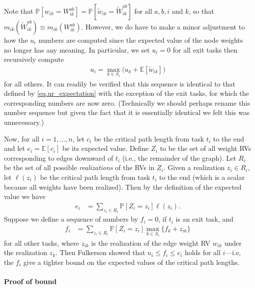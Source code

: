 \documentclass[12pt]{article}
\def\P{\mathbb{P}}
\def\E{\mathbb{E}}
\begin{document}
Note that $\P[w_{ik} = W_{ik}^{ab}] = \P[\tilde{w}_{ik} = \tilde{W}_{ik}^{ab}]$ for all $a, b, i$ and $k$, so that $m_{ik}(\tilde{W}_{ik}^{ab}) \equiv m_{ik}(W_{ik}^{ab})$. However, we do have to make a minor adjustment to how the $u_i$ numbers are computed since the expected value of the node weights no longer has any meaning. In particular, we set $u_i = 0$ for all exit tasks then recursively compute       
\begin{align}
u_i = \max_{k \in S_i} \big( u_k + \E[\tilde{w}_{ik}] \big) \label{eq.ur_edge_only}
\end{align}
for all others. It can readily be verified that this sequence is identical to that defined by \eqref{eq.ur_expectation} with the exception of the exit tasks, for which the corresponding numbers are now zero. (Technically we should perhaps rename this number sequence but given the fact that it is essentially identical we felt this was unnecessary.) 

Now, for all $i = 1, \dots, n$, let $c_i$ be the critical path length from task $t_i$ to the end and let $e_i = \E[c_i]$ be its expected value. Define $Z_i$ to be the set of all weight RVs corresponding to edges downward of $t_i$ (i.e., the remainder of the graph). Let $R_i$ be the set of all possible {\em realizations} of the RVs in $Z_i$. Given a realization $z_i \in R_i$, let $\ell(z_i)$ be the critical path length from task $t_i$ to the end (which is a scalar because all weights have been realized). Then by the definition of the expected value we have
\begin{align}
e_i &= \sum_{z_i \in R_i} \P[Z_i = z_i] \ell(z_i). \label{eq.expected_cp}
\end{align}
Suppose we define a sequence of numbers by $f_i = 0$, if $t_i$ is an exit task, and
\begin{align}
f_i &= \sum_{z_i \in R_i} \P[Z_i = z_i] \max_{k \in S_i} \{ f_k + z_{ik} \} \label{eq.f_fulkerson}
\end{align}
for all other tasks, where $z_{ik}$ is the realization of the edge weight RV $w_{ik}$ under the realization $z_k$. Then Fulkerson showed that $u_i \leq f_i \leq e_i$ holds for all $i$---i.e, the $f_i$ give a tighter bound on the expected values of the critical path lengths.

\paragraph{Proof of bound}
\label{para.fulkerson_proof}

\end{document}
